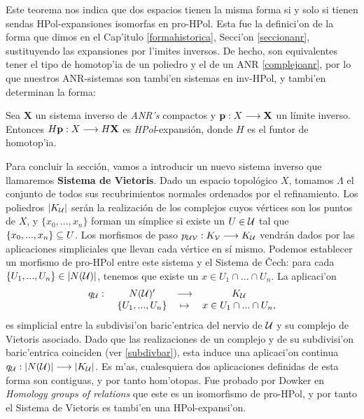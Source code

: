 Este teorema nos indica que dos espacios tienen la misma forma si y solo si tienen sendas HPol-expansiones isomorfas en pro-HPol. Esta fue la definici'on de la forma que dimos en el Cap'itulo \ref{formahistorica}, Secci'on \ref{seccionanr}, sustituyendo las expansiones por l'imites inversos. De hecho, son equivalentes tener el tipo de homotop'ia de un poliedro y el de un ANR \ref{complejoanr}, por lo que nuestros ANR-sistemas son tambi'en sistemas en inv-HPol, y tambi'en determinan la forma:

\begin{theorem}
  Sea $ \mathbf{X}  $ un sistema inverso de \emph{ANR's} compactos y $ \mathbf{p}:X\longrightarrow \mathbf{X}  $ un límite inverso. Entonces $ H \mathbf{p}:X\longrightarrow H\mathbf{X}$ es \emph{HPol}-expansión, donde $H$ es el funtor de homotop'ia.
\end{theorem}

 
Para concluir la sección, vamos a introducir un nuevo sistema inverso que llamaremos \textbf{Sistema de Vietoris}. Dado un espacio topológico $ X  $, tomamos $ \Lambda  $ el conjunto de todos sus recubrimientos normales ordenados por el refinamiento. Los poliedros $ \abs{K_{\mathcal{U}} }  $ serán la realización de los complejos cuyos vértices son los puntos de $ X  $, y $ \{x_0,...,x_n \} $ forman un símplice si existe un $ U\in \mathcal{U}  $ tal que $ \{x_0,...,x_n \}  \subseteq U $. Los morfismos de paso $ p_{\mathcal{U}\mathcal{V}} :K_{\mathcal{V}}\longrightarrow K_{\mathcal{U}}  $ vendrán dados por las aplicaciones simpliciales que llevan cada vértice en sí mismo. Podemos establecer un morfismo de pro-HPol entre este sistema y el Sistema de \v Cech: para cada $ \{U_1,...,U_n\}\in \abs{N(\mathcal{U} )} $, tenemos que existe un $ x\in U_1\cap...\cap U_n  $. La aplicaci'on  
\begin{gather}\label{cechvietoris}
  \begin{matrix}
  q_{\mathcal{U}} : \ &N(\mathcal{U})'&\longrightarrow &K_{\mathcal{U}} \\
  &\{U_1,...,U_n \} &\mapsto &x\in U_1\cap...\cap U_n ,
  \end{matrix}
\end{gather} 
es simplicial entre la subdivisi'on baric'entrica del nervio de $ \mathcal{U}  $ y su complejo de Vietoris asociado. Dado que las realizaciones de un complejo y de su subdivisi'on baric'entrica coinciden (ver \ref{subdivbar}), esta induce una aplicaci'on continua $ q_{\mathcal{U}}:\abs{N(\mathcal{U} )}\longrightarrow \abs{K_{\mathcal{U}} } $. Es m'as, cualesquiera dos aplicaciones definidas de esta forma son contiguas, y por tanto hom'otopas. Fue probado por Dowker en \textit{Homology groups of relations} \cite{dowker1952homology} que este es un isomorfismo de pro-HPol, y por tanto el Sistema de Vietoris es tambi'en una HPol-expansi'on.



